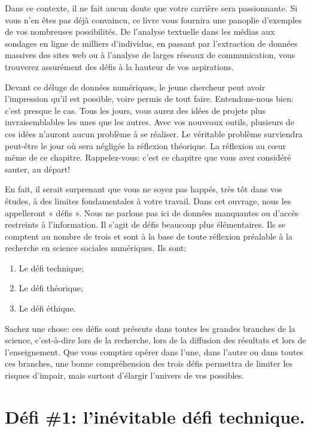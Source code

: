 \documentclass[
  letterpaper,
  DIV=11,
  numbers=noendperiod]{scrreprt}
\providecommand{\tightlist}{%
  \setlength{\itemsep}{0pt}\setlength{\parskip}{0pt}}\usepackage{longtable,booktabs,array}
\begin{document}
Dans ce contexte, il ne fait aucun doute que votre carrière sera
passionnante. Si vous n'en êtes pas déjà convaincu, ce livre vous
fournira une panoplie d'exemples de vos nombreuses possibilités. De
l'analyse textuelle dans les médias aux sondages en ligne de milliers
d'individus, en passant par l'extraction de données massives des sites
web ou à l'analyse de larges réseaux de communication, vous trouverez
assurément des défis à la hauteur de vos aspirations.

Devant ce déluge de données numériques, le jeune chercheur peut avoir
l'impression qu'il est possible, voire permis de tout faire.
Entendons-nous bien: c'est presque le cas. Tous les jours, vous aurez
des idées de projets plus invraisemblables les unes que les autres. Avec
vos nouveaux outils, plusieurs de ces idées n'auront aucun problème à se
réaliser. Le véritable problème surviendra peut-être le jour où sera
négligée la réflexion théorique. La réflexion au cœur même de ce
chapitre. Rappelez-vous: c'est ce chapitre que vous avez considéré
sauter, au départ!

En fait, il serait surprenant que vous ne soyez pas happés, très tôt
dans vos études, à des limites fondamentales à votre travail. Dans cet
ouvrage, nous les appelleront « défis ». Nous ne parlons pas ici de
données manquantes ou d'accès restreints à l'information. Il s'agit de
défis beaucoup plus élémentaires. Ils se comptent au nombre de trois et
sont à la base de toute réflexion préalable à la recherche en science
sociales numériques. Ils sont:

\begin{enumerate}
\def\labelenumi{\arabic{enumi}.}
\tightlist
\item
  Le défi technique;
\item
  Le défi théorique;
\item
  Le défi éthique.
\end{enumerate}

Sachez une chose: ces défis sont présents dans toutes les grandes
branches de la science, c'est-à-dire lors de la recherche, lors de la
diffusion des résultats et lors de l'enseignement. Que vous comptiez
opérer dans l'une, dans l'autre ou dans toutes ces branches, une bonne
compréhension des trois défis permettra de limiter les risques d'impair,
mais surtout d'élargir l'univers de vos possibles.

\hypertarget{duxe9fi-1-linuxe9vitable-duxe9fi-technique.}{%
\section{Défi \#1: l'inévitable défi
technique.}\label{duxe9fi-1-linuxe9vitable-duxe9fi-technique.}}
\end{document}
